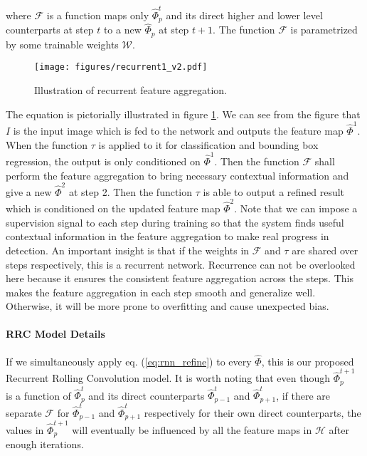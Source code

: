 \documentclass[10pt,twocolumn,letterpaper]{article}
\begin{document}
\noindent where $\mathcal{F}$ is a function maps only $\hat{\Phi}_p^t$ and its direct higher and lower level counterparts at step $t$ to a new $\hat{\Phi}_p$ at step $t+1$. The function $\mathcal{F}$ is parametrized by some trainable weights $\mathcal{W}$.

\begin{figure}[ht]
\begin{center}
\centerline{\texttt{[image: figures/recurrent1\_v2.pdf]}}
\caption{Illustration of recurrent feature aggregation.}
\label{fig:rnn1}
\end{center}
\vskip -0.2in
\end{figure} 

The equation is pictorially illustrated in figure \ref{fig:rnn1}. We can see from the figure that $I$ is the input image which is fed to the network and outputs the feature map $\hat{\Phi}^1$. When the function $\tau$ is applied to it for classification and bounding box regression, the output is only conditioned on $\hat{\Phi}^1$. Then the function $\mathcal{F}$ shall perform the feature aggregation to bring necessary contextual information and give a new $\hat{\Phi}^2$ at step 2. Then the function $\tau$ is able to output a refined result which is conditioned on the updated feature map $\hat{\Phi}^2$. Note that we can impose a supervision signal to each step during training so that the system finds useful contextual information in the feature aggregation to make real progress in detection. An important insight is that if the weights in $\mathcal{F}$ and $\tau$ are shared over steps respectively, this is a recurrent network. Recurrence can not be overlooked here because it ensures the consistent feature aggregation across the steps. This makes the feature aggregation in each step smooth and generalize well. Otherwise, it will be more prone to overfitting and cause unexpected bias.

\paragraph{RRC Model Details}
If we simultaneously apply eq. (\ref{eq:rnn_refine}) to every $\hat{\Phi}$, this is our proposed Recurrent Rolling Convolution model. It is worth noting that even though $\hat{\Phi}_p^{t+1}$ is a function of $\hat{\Phi}_p^{t}$ and its direct counterparts $\hat{\Phi}_{p-1}^{t}$ and $\hat{\Phi}_{p+1}^{t}$, if there are separate $\mathcal{F}$ for $\hat{\Phi}_{p-1}^{t}$ and $\hat{\Phi}_{p+1}^{t}$ respectively for their own direct counterparts, the values in $\hat{\Phi}_p^{t+1}$ will eventually be influenced by all the feature maps in $\mathcal{H}$ after enough iterations. 
\end{document}
